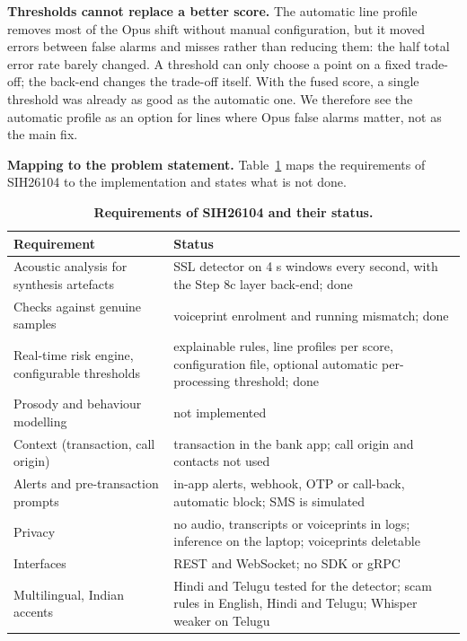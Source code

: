 \documentclass[10pt,a4paper,twocolumn]{article}
\begin{document}
\textbf{Thresholds cannot replace a better score.} The automatic line profile removes most of the Opus shift without manual configuration, but it moved errors between false alarms and misses rather than reducing them: the half total error rate barely changed. A threshold can only choose a point on a fixed trade-off; the back-end changes the trade-off itself. With the fused score, a single threshold was already as good as the automatic one. We therefore see the automatic profile as an option for lines where Opus false alarms matter, not as the main fix.

\textbf{Mapping to the problem statement.} Table~\ref{tab:sih} maps the requirements of SIH26104 to the implementation and states what is not done.

\begin{table}[t]
\centering\footnotesize
\caption{\textbf{Requirements of SIH26104 and their status.}}
\label{tab:sih}
\begin{tabular}{@{}p{}p{}@{}}
\toprule
\textbf{Requirement} & \textbf{Status}\\
\midrule
Acoustic analysis for synthesis artefacts & SSL detector on 4 s windows every second, with the Step 8c layer back-end; done\\
Checks against genuine samples & voiceprint enrolment and running mismatch; done\\
Real-time risk engine, configurable thresholds & explainable rules, line profiles per score, configuration file, optional automatic per-processing threshold; done\\
Prosody and behaviour modelling & not implemented\\
Context (transaction, call origin) & transaction in the bank app; call origin and contacts not used\\
Alerts and pre-transaction prompts & in-app alerts, webhook, OTP or call-back, automatic block; SMS is simulated\\
Privacy & no audio, transcripts or voiceprints in logs; inference on the laptop; voiceprints deletable\\
Interfaces & REST and WebSocket; no SDK or gRPC\\
Multilingual, Indian accents & Hindi and Telugu tested for the detector; scam rules in English, Hindi and Telugu; Whisper weaker on Telugu\\
\bottomrule
\end{tabular}
\end{table}
\end{document}
